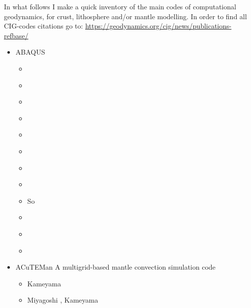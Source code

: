 
In what follows I make a quick inventory of the main codes of computational geodynamics, 
for crust, lithosphere and/or mantle modelling.
In order to find all CIG-codes citations go to: 
\url{https://geodynamics.org/cig/news/publications-refbase/}

\begin{itemize}

\item {\codefont ABAQUS} 

\begin{scriptsize}
\begin{itemize}
\item[\twothousandone] \cite{brry01}
\item[\twothousandtwo] \cite{gedh02}
\item[\twothousandthree] \cite{fumr03}
\item[\twothousandsix] \cite{hapf06}
\item[\twothousandseven] \cite{camg07}
\item[\twothousandnine] \cite{kuhe09}\cite{makh09}
\item[\twothousandten] \cite{camg10}
\item[\twothousandtwelve] \cite{nalr12}
\item[\twothousandthirteen] So \etal \cite{soyl13}
\item[\twothousandfifteen] \cite{pevp15}
\item[\twothousandseventeen] \cite{naam17}
\item[\twothousandeighteen] \cite{naam18}
\end{itemize}
\end{scriptsize}

\item {\codefont ACuTEMan} 
A multigrid-based mantle convection simulation code

\begin{scriptsize}
\begin{itemize}
\item Kameyama \cite{kame05}
\item Miyagoshi \etal \cite{miko15}, Kameyama \etal \cite{kamo15}
\end{itemize}
\end{scriptsize}


\end{itemize}
